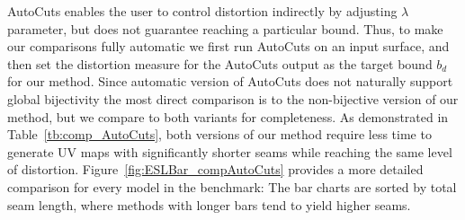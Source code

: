 AutoCuts enables the user to control distortion indirectly by adjusting $\lambda$ parameter, but does not guarantee reaching a particular bound. Thus, to make our comparisons fully automatic we first run AutoCuts on an input surface, and then set the distortion measure for the AutoCuts output as the target bound $b_d$ for our method. Since automatic version of AutoCuts does not naturally support global bijectivity the most direct comparison is to the non-bijective version of our method, but we compare to both variants for completeness.  As demonstrated in Table~\ref{tb:comp_AutoCuts}, both versions of our method require less time to generate UV maps with significantly shorter seams while reaching the same level of distortion. Figure~\ref{fig:ESLBar_compAutoCuts} provides a more detailed comparison for every model in the benchmark:  The bar charts are sorted by total seam length, where methods with longer bars tend to yield higher  seams.
%

